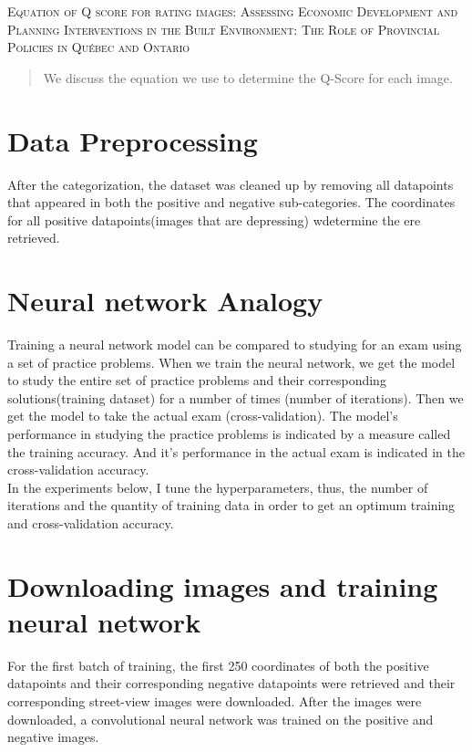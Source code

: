 \documentclass[12pt]{article}
\begin{document}

\textsc{Equation of Q score for rating images: Assessing Economic Development and Planning Interventions in the Built Environment: The Role of Provincial Policies in Québec and Ontario}
\author{Alphonsus Adu-Bredu$^{1}$ \\
	\mbox{}\\
	$^1$Tufts University, Medford - Massachusetts \\
	alphonsus.adu\_bredu@tufts.edu}


\begin{abstract}
	We discuss the equation we use to determine the Q-Score for each image.
\end{abstract}
\section{Data Preprocessing}
After the categorization, the dataset was cleaned up by removing all datapoints that appeared in both the positive and negative sub-categories. The coordinates for all positive datapoints(images that are depressing) wdetermine the ere retrieved. 

\section{Neural network Analogy}
Training a neural network model can be compared to studying for an exam using a set of practice problems. When we train the neural network, we get the model to study the entire set of practice problems and their corresponding solutions(training dataset) for a number of times (number of iterations). Then we get the model to take the actual exam (cross-validation). The model's performance in studying the practice problems is indicated by a measure called the training accuracy. And it's performance in the actual exam is indicated in the cross-validation accuracy.\\
In the experiments below, I tune the hyperparameters, thus, the number of iterations and the quantity of training data in order to get an optimum training and cross-validation accuracy.\\

\section{Downloading images and training neural network}
For the first batch of training, the first 250 coordinates of both the positive datapoints and their corresponding negative datapoints were retrieved and their corresponding street-view images were downloaded. After the images were downloaded, a convolutional neural network was trained on the positive and negative images. 
\end{document}
